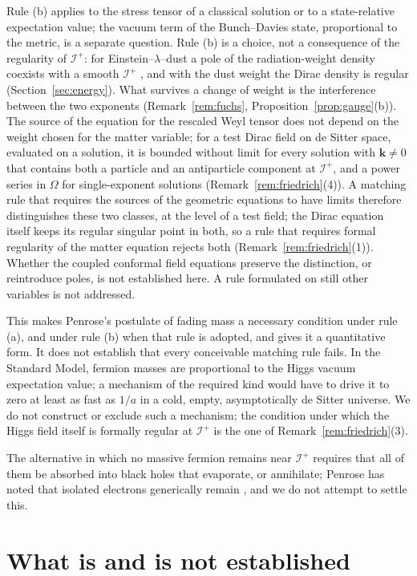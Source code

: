 \documentclass[11pt,a4paper]{article}
\theoremstyle{definition}
\newcommand{\scri}{\mathscr{I}^{+}}
\begin{document}
Rule (b) applies to the stress tensor of a classical solution or to a state-relative expectation value; the vacuum term of the Bunch--Davies state, proportional to the metric, is a separate question. Rule (b) is a choice, not a consequence of the regularity of $\scri$: for Einstein--$\lambda$--dust a pole of the radiation-weight density coexists with a smooth $\scri$ \cite{Friedrich2017}, and with the dust weight the Dirac density is regular (Section~\ref{sec:energy}). What survives a change of weight is the interference between the two exponents (Remark~\ref{rem:fuchs}, Proposition~\ref{prop:gauge}(b)). The source of the equation for the rescaled Weyl tensor does not depend on the weight chosen for the matter variable; for a test Dirac field on de Sitter space, evaluated on a solution, it is bounded without limit for every solution with $\mathbf{k}\neq0$ that contains both a particle and an antiparticle component at $\scri$, and a power series in $\Omega$ for single-exponent solutions (Remark~\ref{rem:friedrich}(4)). A matching rule that requires the sources of the geometric equations to have limits therefore distinguishes these two classes, at the level of a test field; the Dirac equation itself keeps its regular singular point in both, so a rule that requires formal regularity of the matter equation rejects both (Remark~\ref{rem:friedrich}(1)). Whether the coupled conformal field equations preserve the distinction, or reintroduce poles, is not established here. A rule formulated on still other variables is not addressed.

This makes Penrose's postulate of fading mass a necessary condition under rule (a), and under rule (b) when that rule is adopted, and gives it a quantitative form. It does not establish that every conceivable matching rule fails. In the Standard Model, fermion masses are proportional to the Higgs vacuum expectation value; a mechanism of the required kind would have to drive it to zero at least as fast as $1/a$ in a cold, empty, asymptotically de Sitter universe. We do not construct or exclude such a mechanism; the condition under which the Higgs field itself is formally regular at $\scri$ is the one of Remark~\ref{rem:friedrich}(3).

The alternative in which no massive fermion remains near $\scri$ requires that all of them be absorbed into black holes that evaporate, or annihilate; Penrose has noted that isolated electrons generically remain \cite{Penrose2010}, and we do not attempt to settle this.

\section{What is and is not established}
\label{sec:scope}
\end{document}
